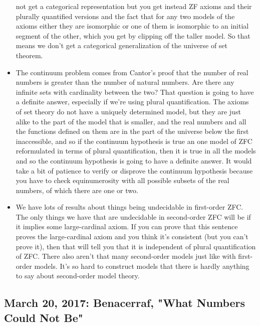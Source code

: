 \documentclass[12pt]{article}
\theoremstyle{definition}
\begin{document}
\begin{itemize}
        not get a categorical representation but you get instead ZF axioms and
        their plurally quantified versions and the fact that for any two models
        of the axioms either they are isomorphic or one of them is isomorphic
        to an initial segment of the other, which you get by clipping off the
        taller model. So that means we don't get a categorical generalization
        of the universe of set theorem.
    \item
        The continuum problem comes from Cantor's proof that the number of real
        numbers is greater than the number of natural numbers. Are there any
        infinite sets with cardinality between the two? That question is going
        to have a definite answer, especially if we're using plural
        quantification. The axioms of set theory do not have a uniquely
        determined model, but they are just alike to the part of the model that
        is smaller, and the real numbers and all the functions defined on them
        are in the part of the universe below the first inaccessible, and so if
        the continuum hypothesis is true an one model of ZFC reformulated in
        terms of plural quantification, then it is true in all the models and
        so the continuum hypothesis is going to have a definite answer. It
        would take a bit of patience to verify or disprove the continuum
        hypothesis because you have to check equinumerosity with all possible
        subsets of the real numbers, of which there are one or two.
    \item
        We have lots of results about things being undecidable in first-order
        ZFC. The only things we have that are undecidable in second-order ZFC
        will be if it implies some large-cardinal axiom. If you can prove that
        this sentence proves the large-cardinal axiom and you think it's
        consistent (but you can't prove it), then that will tell you that it is
        independent of plural quantification of ZFC. There also aren't that
        many second-order models just like with first-order models. It's so
        hard to construct models that there is hardly anything to say about
        second-order model theory.
\end{itemize}

\subsection{March 20, 2017: Benacerraf, "What Numbers Could Not Be"}
\end{document}
